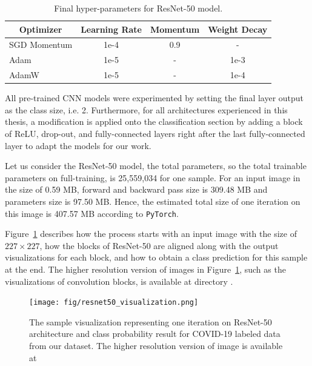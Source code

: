 \begin{table}[h]
\centering
\caption{Final hyper-parameters for ResNet-50 model.}
\label{tab:cnn_hyperparameters}
\begin{tabular}{lccc}
\hline 
\multicolumn{1}{c}{\textbf{Optimizer}} & \textbf{Learning Rate} & \textbf{Momentum} & \textbf{Weight Decay} \\ \hline \hline
SGD Momentum                           & 1e-4                   & 0.9               & -                     \\ 
Adam                                   & 1e-5                   & -                 & 1e-3                     \\ 
AdamW                                  & 1e-5                   & -                 & 1e-4   \\  \hline              
\end{tabular}
\end{table}

All pre-trained CNN models were experimented by setting the final layer output as the class size, i.e. 2. Furthermore, for all architectures experienced in this thesis,  a modification is applied onto the classification section by adding a block of ReLU, drop-out, and fully-connected layers right after the last fully-connected layer to adapt the models for our work.

Let us consider the ResNet-50 model, the total parameters, so the total trainable parameters on full-training, is 25,559,034 for one sample. For an input image in the size of 0.59 MB, forward and backward pass size is 309.48 MB and parameters size is 97.50 MB. Hence, the estimated total size of one iteration on this image is 407.57 MB according to \verb|PyTorch|.

Figure~\ref{fig:resnet50_visualization} describes how the process starts with an input image with the size of $227 \times 227$, how the blocks of ResNet-50 are aligned along with the output visualizations for each block, and how to obtain a class prediction for this sample at the end. The higher resolution version of images in Figure~\ref{fig:resnet50_visualization}, such as the visualizations of convolution blocks, is available at directory \textcolor{blue}{}.


\begin{landscape}
\begin{figure}[h]
    \centering
    \texttt{[image: fig/resnet50\_visualization.png]}
    \vspace{1mm}
    \caption{The sample visualization representing one iteration on ResNet-50 architecture and class probability result for COVID-19 labeled data from our dataset. The higher resolution version of image is available at \\  \textcolor{blue}{}}
    \label{fig:resnet50_visualization}
\end{figure}
\end{landscape}

